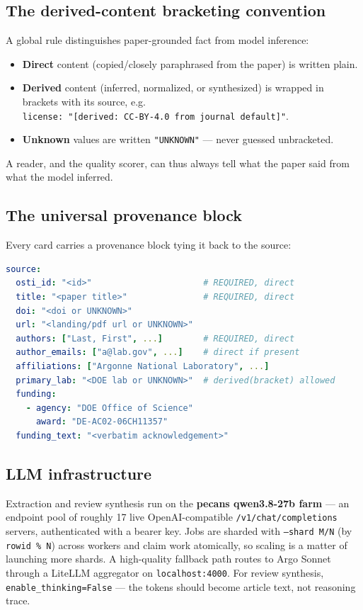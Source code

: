 \documentclass[11pt,letterpaper]{article}
\newcommand{\code}[1]{\texttt{\small #1}}
\begin{document}
\subsection{The derived-content bracketing convention}

A global rule distinguishes paper-grounded fact from model inference:

\begin{itemize}[noitemsep,topsep=2pt]
\item \textbf{Direct} content (copied/closely paraphrased from the paper) is written
  plain.
\item \textbf{Derived} content (inferred, normalized, or synthesized) is wrapped in
  brackets with its source, e.g.\\
  \code{license: "[derived: CC-BY-4.0 from journal default]"}.
\item \textbf{Unknown} values are written \code{"UNKNOWN"} --- never guessed
  unbracketed.
\end{itemize}

A reader, and the quality scorer, can thus always tell what the paper said from what
the model inferred.

\subsection{The universal provenance block}

Every card carries a provenance block tying it back to the source:

\begin{lstlisting}[language=yaml]
source:
  osti_id: "<id>"                      # REQUIRED, direct
  title: "<paper title>"               # REQUIRED, direct
  doi: "<doi or UNKNOWN>"
  url: "<landing/pdf url or UNKNOWN>"
  authors: ["Last, First", ...]        # REQUIRED, direct
  author_emails: ["a@lab.gov", ...]    # direct if present
  affiliations: ["Argonne National Laboratory", ...]
  primary_lab: "<DOE lab or UNKNOWN>"  # derived(bracket) allowed
  funding:
    - agency: "DOE Office of Science"
      award: "DE-AC02-06CH11357"
  funding_text: "<verbatim acknowledgement>"
\end{lstlisting}

\subsection{LLM infrastructure}

Extraction and review synthesis run on the \textbf{pecans qwen3.8-27b farm} --- an
endpoint pool of roughly 17 live OpenAI-compatible \code{/v1/chat/completions}
servers, authenticated with a bearer key. Jobs are sharded with \code{--shard M/N}
(by \code{rowid \% N}) across workers and claim work atomically, so scaling is a
matter of launching more shards. A high-quality fallback path routes to Argo Sonnet
through a LiteLLM aggregator on \code{localhost:4000}. For review synthesis,
\code{enable\_thinking=False} --- the tokens should become article text, not
reasoning trace.
\end{document}
